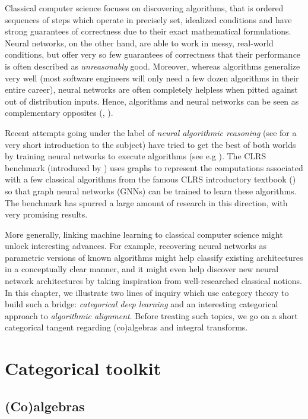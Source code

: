 \documentclass[11pt,a4paper,openright,twoside]{report}
\theoremstyle{plain}
\theoremstyle{definition}
\begin{document}
Classical computer science focuses on discovering algorithms, that is ordered sequences of steps which operate in precisely set, idealized conditions and have strong guarantees of correctness due to their exact mathematical formulations. Neural networks, on the other hand, are able to work in messy, real-world conditions, but offer very so few guarantees of correctness that their performance is often described as \textit{unreasonably} good. Moreover, whereas algorithms generalize very well (most software engineers will only need a few dozen algorithms in their entire career), neural networks are often completely helpless when pitted against out of distribution inputs. Hence, algorithms and neural networks can be seen as complementary opposites (\cite{velivckovic2021neural}, \cite{velivckovic2022clrs}).

Recent attempts going under the label of \textit{neural algorithmic reasoning} (see \cite{velivckovic2021neural} for a very short introduction to the subject) have tried to get the best of both worlds by training neural networks to execute algorithms (see e.g \cite{ibarz2022generalist}). The CLRS benchmark (introduced by \cite{velivckovic2022clrs}) uses graphs to represent the computations associated with a few classical algorithms from the famous CLRS introductory textbook (\cite{cormen2022introduction}) so that graph neural networks (GNNs) can be trained to learn these algorithms. The benchmark has spurred a large amount of research in this direction, with very promising results.

More generally, linking machine learning to classical computer science might unlock interesting advances. For example, recovering neural networks as parametric versions of known algorithms might help classify existing architectures in a conceptually clear manner, and it might even help discover new neural network architectures by taking inspiration from well-researched classical notions. In this chapter, we illustrate two lines of inquiry which use category theory to build such a bridge: \textit{categorical deep learning} and an interesting categorical approach to \textit{algorithmic alignment}. Before treating such topics, we go on a short categorical tangent regarding (co)algebras and integral transforms.

\section{Categorical toolkit}

\subsection{(Co)algebras}
\label{subsec: algebras}
\end{document}
